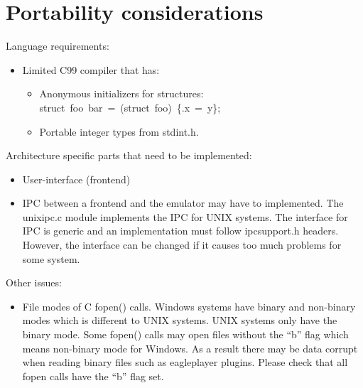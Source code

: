 \documentclass{article}
\begin{document}
\section{Portability considerations}

Language requirements:
\begin{itemize}
\item Limited C99 compiler that has:
  \begin{itemize}
  \item Anonymous initializers for structures: \mbox{struct foo bar = (struct foo) \{.x = y\};}
  \item Portable integer types from stdint.h.
  \end{itemize}
\end{itemize}

Architecture specific parts that need to be implemented:
\begin{itemize}
\item User-interface (frontend)
\item IPC between a frontend and the emulator
  may have to implemented. The unixipc.c module implements the IPC for UNIX
  systems. The interface for IPC is generic and an implementation must
  follow ipcsupport.h headers. However, the interface can be changed if it
  causes too much problems for some system.
\end{itemize}

Other issues:
\begin{itemize}
\item File modes of C fopen() calls. Windows systems have binary and
  non-binary modes which is different to UNIX systems. UNIX systems only
  have the binary mode. Some fopen() calls may open files without the ``b''
  flag which means non-binary mode for Windows. As a result there may be
  data corrupt when reading binary files such as eagleplayer plugins. Please
  check that all fopen calls have the ``b'' flag set.
\end{itemize}
\end{document}
